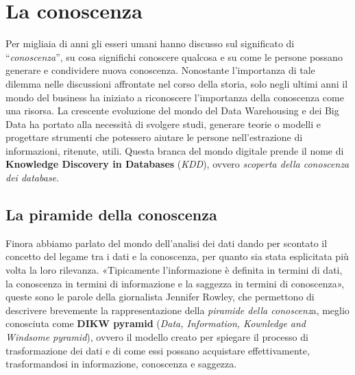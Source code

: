 
\section{La conoscenza}

Per migliaia di anni gli esseri umani hanno discusso sul significato di “\textit{conoscenza}”, su cosa significhi conoscere qualcosa e su come le persone possano generare e condividere nuova conoscenza. Nonostante l'importanza di tale dilemma nelle discussioni affrontate nel corso della storia, solo negli ultimi anni il mondo del business ha iniziato a riconoscere l'importanza della conoscenza come una risorsa.\cite{knowledge_management_tools}
La crescente evoluzione del mondo del Data Warehousing e dei Big Data ha portato alla necessità di svolgere studi, generare teorie o modelli e progettare strumenti che potessero aiutare le persone nell'estrazione di informazioni, ritenute, utili. Questa branca del mondo digitale prende il nome di \textbf{Knowledge Discovery in Databases} (\textit{KDD}), ovvero \textit{scoperta della conoscenza dei database}.

\subsection{La piramide della conoscenza}
Finora abbiamo parlato del mondo dell'analisi dei dati dando per scontato il concetto del legame tra i dati e la conoscenza, per quanto sia stata esplicitata più volta la loro rilevanza. «Tipicamente l'informazione è definita in termini di dati, la conoscenza in termini di informazione e la saggezza in termini di conoscenza», queste sono le parole della giornalista Jennifer Rowley\cite{rowley_dikw_hierarchy}, che permettono di descrivere brevemente la rappresentazione della \textit{piramide della conoscenz}a, meglio conosciuta come \textbf{DIKW pyramid} (\textit{Data, Information, Kownledge and Windsome pyramid}), ovvero il modello creato per spiegare il processo di trasformazione dei dati e di come essi possano acquistare effettivamente, trasformandosi in informazione, conoscenza e saggezza.

